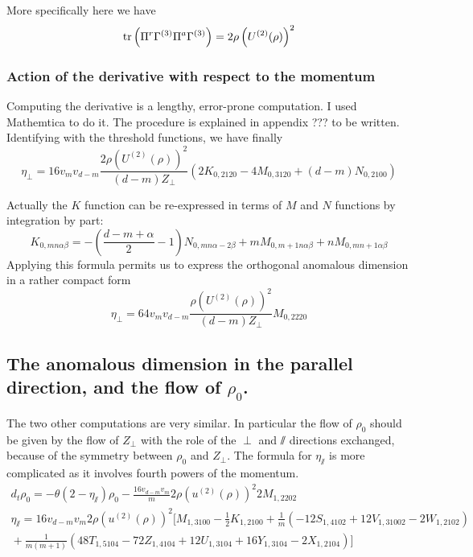 More specifically here we have
\begin{equation}
 \text{tr}\left(\Pi^r \Gamma^{(3)} \Pi^a \Gamma^{(3)}\right)  = 2 \rho \left ( U^{(2)}(\rho) \right )^2
\end{equation}

\subsubsection{Action of the derivative with respect to the momentum}
Computing the derivative is a lengthy, error-prone computation. I used Mathemtica to do it. The procedure is explained in appendix ??? to be written.
Identifying with the threshold functions, we have finally
\begin{equation}
\eta_\perp = 16 v_m v_{d-m} \frac{2 \rho \left( U^{(2)}(\rho) \right)^2}{(d-m)Z_\perp} \left( 2 K_{0,2120} - 4 M_{0,3120} + (d-m)N_{0,2100} \right)
\end{equation}

Actually the $K$ function can be re-expressed in terms of $M$ and $N$ functions by integration by part:
\begin{equation}
K_{0,mn\alpha \beta} = -\left(\frac{d-m+\alpha}{2}-1\right) N_{0,mn \alpha-2 \beta} + m M_{0,m+1 n \alpha \beta} + n M_{0,m n+1 \alpha \beta}
\end{equation}
Applying this formula permits us to express the orthogonal anomalous dimension in a rather compact form
\begin{equation}
\label{eq:flow_perp}
\eta_\perp = 64 v_m v_{d-m} \frac{ \rho \left( U^{(2)}(\rho) \right)^2}{(d-m)Z_\perp} M_{0,2220}
\end{equation}

\subsection{The anomalous dimension in the parallel direction, and the flow of $\rho_0$.}

The two other computations are very similar. In particular the flow of $\rho_0$ should be given by the flow of $Z_\perp$ with the role of the $\perp$ and $\sslash$ directions exchanged, because of the symmetry between $\rho_0$ and $Z_\perp$. The formula for $\eta_\sslash$ is more complicated as it involves fourth powers of the momentum.
\begin{align}
\label{eq:flow_rho_ss}
d_t \rho_0 = -\theta \left(2-\eta_\sslash\right) \rho_0 - \frac{16 v_{d-m} v_m}{m} 2 \rho \left( u^{(2)}(\rho) \right)^2 2 M_{1,2202} \\
\eta_\sslash = 16 v_{d-m} v_m 2 \rho \left( u^{(2)}(\rho) \right)^2 
\Bigg[ M_{1,3100} - \frac{1}{2} K_{1,2100} + \frac{1}{m}\left( -12 S_{1,4102} + 12V_{1,31002} -2W_{1,2102} \right) \\
{}+ \frac{1}{m(m+1)}\left( 48 T_{1,5104} -72 Z_{1,4104} +12 U_{1,3104} +16 Y_{1,3104} -2 X_{1,2104} \right) \Bigg]
\end{align}

